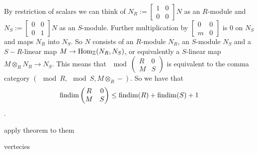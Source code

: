 By restriction of scalars we can think of $N_R:=\begin{bmatrix}
	1 & 0\\
	0 & 0
\end{bmatrix}N$ as an $R$-module and $N_S:=\begin{bmatrix}
0 & 0\\
0 & 1
\end{bmatrix}N$ as an $S$-module. Further multiplication by $\begin{bmatrix}
0 & 0\\
m & 0
\end{bmatrix}$ is 0 on $N_S$ and maps $N_R$ into $N_S$. So $N$ consists of an $R$-module $N_R$, an $S$-module $N_S$ and a $S-R$-linear map $M \to \operatorname{Hom}_\mathbb{Z}(N_R, N_S)$, or equivalently a $S$-linear map $M \otimes_R N_R \to N_S$. This means that $\mod \begin{pmatrix}
R & 0\\
M & S
\end{pmatrix}$ is equivalent to the comma category $(\mod R, \mod S, M \otimes_R -)$. So we have that $$\operatorname{findim}\begin{pmatrix}
R & 0\\
M & S
\end{pmatrix} \leq \operatorname{findim}(R) + \operatorname{findim}(S)+1$$.

apply theorem to them

vertecies
